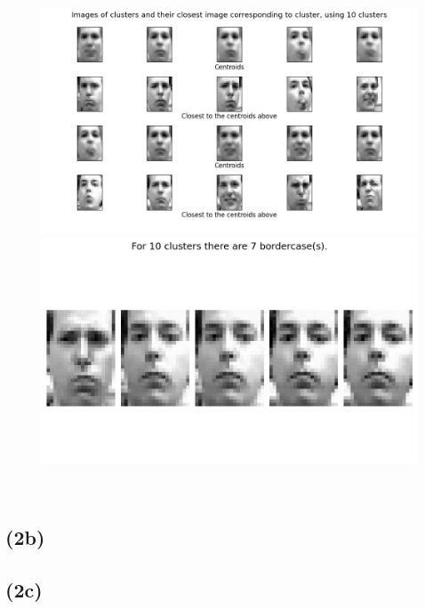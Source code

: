 \documentclass[12pt, letterpaper]{article}
\begin{document}
      \begin{figure}[H]
        \caption{}
        \centering
        \includegraphics[scale=0.7]{cluster10}
        \includegraphics[scale=0.4]{border10}
      \end{figure}\\
    \subsection*{(2b)}
    \subsection*{(2c)}
\end{document}
